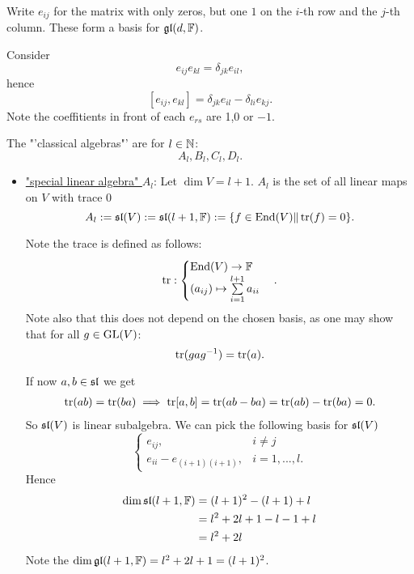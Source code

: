 \begin{remark}
    Write $e_{ij}$ for the matrix with only zeros, but one $1$ on the $i$-th row and the $j$-th column.
    These form a basis for $\gl(d,\F)$.

    Consider
    $$e_{ij} e_{kl} = \delta_{jk}e_{il}, $$ 
    hence
    $$[e_{ij}, e_{kl}] = \delta_{jk}e_{il} - \delta_{li} e_{kj}.$$
    Note the coeffitients in front of each $e_{rs}$ are 1,0 or  $-1$.
\end{remark}

\begin{example}
    The "'classical algebras"' are for $l \in \N$:
    $$A_l, B_l, C_l, D_l. $$

    \begin{itemize}[label=]
        \item \underline{"special linear algebra" $A_l$}:
        Let $\dim V = l+1$. $A_l$ is the set of all linear maps on $V$ with trace 0
        $$ A_l := \sl(V) := \sl(l+1, \F) := \{f \in \textrm{End}(V) \| \tr(f) = 0\}.$$

        Note the trace is defined as follows:
        $$ \tr : \begin{cases}
            \End(V) \to \F \\
            (a_{ij}) \mapsto \sum\limits_{i=1}^{l+1} a_{ii}             
        \end{cases}. $$
        Note also that this does not depend on the chosen basis, 
        as one may show that for all $g \in \GL(V)$:
        $$ \tr(gag^{-1}) = \tr(a). $$

        If now $a,b \in \sl$ we get
        \begin{align*}
            \tr(ab) = \tr(ba) \implies \tr [a,b] = \tr (ab - ba) = \tr(ab) - \tr(ba) = 0. 
        \end{align*}
        So $\sl(V)$ is linear subalgebra.
        We can pick the following basis for $\sl(V)$
        $$\begin{cases}
            e_{ij}, & i \ne j \\
            e_{ii} - e_{(i+1) (i+1)}, & i=1,...,l. 
        \end{cases}$$
        Hence
        \begin{align*}
            \dim \sl(l+1, \F) &= (l+1)^2 - (l+1) + l\\ 
                              &= l^2 +2l +1 -l -1 + l\\
                              &= l^2 +2l
        \end{align*}
        Note the $\dim \gl(l+1,\F) = l^2 + 2l +1 = (l+1)^2 $.


\end{itemize}
\end{example}
